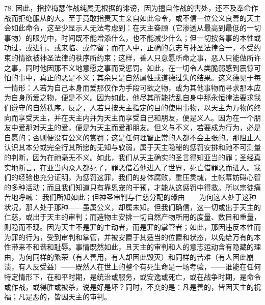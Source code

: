 78. 因此，指控梅瑟作战纯属无根据的诽谤，因为擅自作战的害处，还不及奉命作战而拒绝服从的大。至于竟敢指责天主亲自如此命令，或不信一位公义良善的天主会如此命令，这至少显示人无法考虑到：在天主眷顾（它渗透从最高到最低的一切事物）的眼光中，时间既不能增添什么，也不能减少什么；但一切按各事的本性或功过，或进行、或来临、或停留；而在人中，正确的意志与神圣法律合一，不受约束的情欲被神圣法律的秩序所约束；这样，善人只意愿所命之事，恶人只能做所许之事，同时他因那不义地意愿之事而受惩罚。如此，在一切令人类脆弱感到震惊可怕的事中，真正的恶是不义；其余只是自然属性或道德过失的结果。这义德见于每一情形：人若为自己本身而爱那仅作为手段可欲之物，或为其他事物而寻求那本应为自身所爱之物，便是不义。因为如此，他尽其所能扰乱自身中那永恒律法要求我们遵守的自然秩序。反之，人若只按天主指定的目的使用事物，以天主为万物的终向而享受天主，并在天主内并为天主而享受自己和朋友，便是义人。因为在一个朋友中爱那对天主的爱，便是为天主而爱那朋友。但义与不义，若要成为行为，必是自愿的；否则便没有公义的赏罚；这是任何理智正常的人都不会主张的。那阻止人认识其本分或完全行其所愿的无知与软弱，属于天主隐秘的惩罚安排和祂不可测量的判断，因为在祂毫无不义。如此，我们从天主确实的圣言得知亚当的罪；圣经真实地断言，在亚当内众人都死了，罪恶借着他进入了世界，死亡借罪恶而进入。我们的经验也充分证明，为惩罚这罪，我们的身体腐败，重压灵魂，土帐幕妨碍心智的多种活动；而且我们知道只有靠恩宠的干预，才能从这惩罚中得救。所以宗徒痛苦地呼喊： 我们所知如此；但神圣审判与仁慈分配的缘由——为何这人处于这种状况，那人处于那种——虽属公义，却属未知。但我们确信，这一切或出于天主的仁慈，或出于天主的审判；而造物主安排一切自然产物所用的度量、数目和重量，则隐而不现。因为天主不是罪的主动者，而是罪的掌管者；如此，那因违反本性而为罪的行为，受到审判和掌管，并被安置于其适当的位置和状态，以免给万有的本性带来不和谐和耻辱。事情既然如此，且天主的审判和人的意志运动含有隐藏的理由，为何同样的繁荣（有人善用，有人却因此毁灭）和同样的苦难（有人因此崩溃，有人反受益）——既然人在世上的整个有死生命是一场考验，——谁能在任何特定情形下，在和平时期，是统治或服务，或安逸或死亡，或在战争时期，是命令或作战，或得胜或被杀，说是好是坏？同时，不变的是：凡是善的，皆因天主的祝福；凡是恶的，皆因天主的审判。\par


